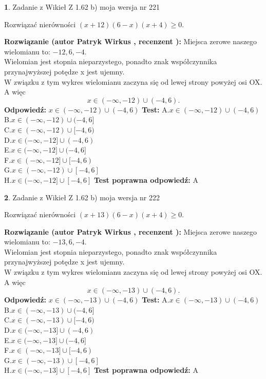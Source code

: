 \documentclass[12pt, a4paper]{article}
\theoremstyle{definition} %
\newtheorem{zad}{}
\newcommand{\zadStart}[1]{\begin{zad}#1\newline}
\newcommand{\zadStop}{\end{zad}}
\newcommand{\rozwStart}[2]{\noindent \textbf{Rozwiązanie (autor #1 , recenzent #2): }\newline}
\newcommand{\rozwStop}{\newline}
\newcommand{\odpStart}{\noindent \textbf{Odpowiedź:}\newline}
\newcommand{\odpStop}{\newline}
\newcommand{\testStart}{\noindent \textbf{Test:}\newline}
\newcommand{\testStop}{\newline}
\newcommand{\kluczStart}{\noindent \textbf{Test poprawna odpowiedź:}\newline}
\newcommand{\kluczStop}{\newline}
\begin{document}
\zadStart{Zadanie z Wikieł Z 1.62 b) moja wersja nr 221}

Rozwiązać nierówności $(x+12)(6-x)(x+4)\ge0$.
\zadStop
\rozwStart{Patryk Wirkus}{}
Miejsca zerowe naszego wielomianu to: $-12, 6, -4$.\\
Wielomian jest stopnia nieparzystego, ponadto znak współczynnika przy\linebreak najwyższej potędze x jest ujemny.\\ W związku z tym wykres wielomianu zaczyna się od lewej strony powyżej osi OX. A więc $$x \in (-\infty,-12) \cup (-4,6).$$
\rozwStop
\odpStart
$x \in (-\infty,-12) \cup (-4,6)$
\odpStop
\testStart
A.$x \in (-\infty,-12) \cup (-4,6)$\\
B.$x \in (-\infty,-12) \cup (-4,6]$\\
C.$x \in (-\infty,-12) \cup [-4,6)$\\
D.$x \in (-\infty,-12] \cup (-4,6)$\\
E.$x \in (-\infty,-12] \cup (-4,6]$\\
F.$x \in (-\infty,-12] \cup [-4,6)$\\
G.$x \in (-\infty,-12) \cup [-4,6]$\\
H.$x \in (-\infty,-12] \cup [-4,6]$
\testStop
\kluczStart
A
\kluczStop



\zadStart{Zadanie z Wikieł Z 1.62 b) moja wersja nr 222}

Rozwiązać nierówności $(x+13)(6-x)(x+4)\ge0$.
\zadStop
\rozwStart{Patryk Wirkus}{}
Miejsca zerowe naszego wielomianu to: $-13, 6, -4$.\\
Wielomian jest stopnia nieparzystego, ponadto znak współczynnika przy\linebreak najwyższej potędze x jest ujemny.\\ W związku z tym wykres wielomianu zaczyna się od lewej strony powyżej osi OX. A więc $$x \in (-\infty,-13) \cup (-4,6).$$
\rozwStop
\odpStart
$x \in (-\infty,-13) \cup (-4,6)$
\odpStop
\testStart
A.$x \in (-\infty,-13) \cup (-4,6)$\\
B.$x \in (-\infty,-13) \cup (-4,6]$\\
C.$x \in (-\infty,-13) \cup [-4,6)$\\
D.$x \in (-\infty,-13] \cup (-4,6)$\\
E.$x \in (-\infty,-13] \cup (-4,6]$\\
F.$x \in (-\infty,-13] \cup [-4,6)$\\
G.$x \in (-\infty,-13) \cup [-4,6]$\\
H.$x \in (-\infty,-13] \cup [-4,6]$
\testStop
\kluczStart
A
\kluczStop
\end{document}
